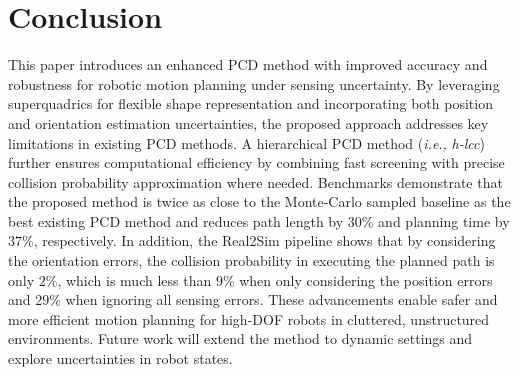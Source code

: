 \documentclass[conference]{IEEEtran}
\newcommand{\ie}{{\it i.e.,}}
\begin{document}
\section{Conclusion}
This paper introduces an enhanced PCD method with improved accuracy and robustness for robotic motion planning under sensing uncertainty. By leveraging superquadrics for flexible shape representation and incorporating both position and orientation estimation uncertainties, the proposed approach addresses key limitations in existing PCD methods. A hierarchical PCD method (\ie{ \textit{h-lcc}}) further ensures computational efficiency by combining fast screening with precise collision probability approximation where needed. Benchmarks demonstrate that the proposed method is twice as close to the Monte-Carlo sampled baseline as the best existing PCD method and reduces path length by $30\%$ and planning time by $37\%$, respectively.
In addition, the Real2Sim pipeline shows that by considering the orientation errors, the collision probability in executing the planned path is only $2\%$, which is much less than $9\%$ when only considering the position errors and $29\%$ when ignoring all sensing errors. These advancements enable safer and more efficient motion planning for high-DOF robots in cluttered, unstructured environments. Future work will extend the method to dynamic settings and explore uncertainties in robot states. 

\printbibliography
\end{document}
